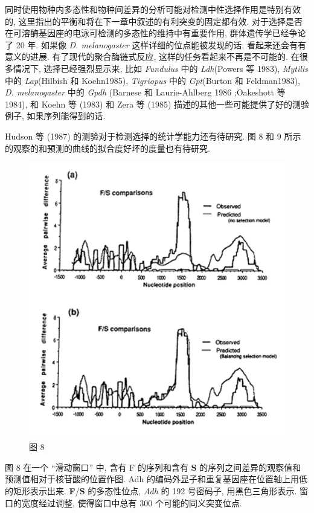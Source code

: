 \documentclass[
    12pt,%
    ]{article}
\begin{document}
同时使用物种内多态性和物种间差异的分析可能对检测中性选择作用是特别有效的,
这里指出的平衡和将在下一章中叙述的有利突变的固定都有效. 对于选择是否在可溶酶基因座的电泳可检测的多态性的维持中有重要作用,
群体遗传学已经争论了 20 年. 如果像 \textit{D. melanogaster} 这样详细的位点能被发现的话, 看起来还会有有意义的进展.
有了现代的聚合酶链式反应, 这样的任务看起来不再是不可能的. 在很多情况下, 选择已经强烈显示来,
比如 \textit{Fundulus} 中的 \textit{Ldh}(Powers 等 1983), \textit{Mytilis} 中的 \textit{Lap}(Hilbish 和
Koehn1985), \textit{Tigriopus} 中的 \textit{Gpt}(Burton 和 Feldman1983), \textit{D.
    melanogaster} 中的 \textit{Gpdh} (Barnese 和 Laurie-Ahlberg 1986 ;Oakeshott 等 1984), 和 Koehn 等 (1983)
和 Zera 等 (1985) 描述的其他一些可能提供了好的测验例子, 如果序列能得到的话.

Hudson 等 (1987) 的测验对于检测选择的统计学能力还有待研究. 图 8 和 9
所示的观察的和预测的曲线的拟合度好坏的度量也有待研究.

\begin{figure}
    \centering
    \includegraphics{coalescent-process.images/image8.png}
    \caption{图 8}
\end{figure}

图 8 在一个 ``滑动窗口'' 中, 含有 F 的序列和含有 \textbf{S} 的序列之间差异的观察值和预测值相对于核苷酸的位置作图. Adh
的编码外显子和重复基因座在位置轴上用低的矩形表示出来. \textbf{F}/\textbf{S} 的多态性位点, \textit{Adh} 的 192
号密码子, 用黑色三角形表示. 窗口的宽度经过调整, 使得窗口中总有 300 个可能的同义突变位点.
\end{document}
